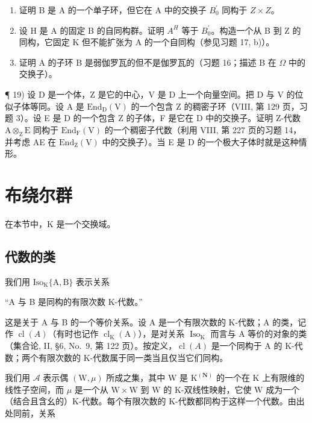 \begin{enumerate}
\def\labelenumi{\alph{enumi})}
\setcounter{enumi}{1}
\item
  证明 B 是 A 的一个单子环，但它在 A 中的交换子 \(B_{0}^{\prime}\) 同构于 \(Z \times Z\)。
\item
  设 H 是 A 的固定 B 的自同构群。证明 \(A^{H}\) 等于 \(B_{0}^{\prime}\)。构造一个从 B 到 Z 的同构，它固定 K 但不能扩张为 A 的一个自同构（参见习题 17, b)）。
\item
  证明 A 的子环 B 是弱伽罗瓦的但不是伽罗瓦的（习题 16；描述 B 在 \(\Omega\) 中的交换子）。
\end{enumerate}

¶ 19) 设 D 是一个体，Z 是它的中心，V 是 D 上一个向量空间。把 D 与 V 的位似子体等同。设 A 是 \(\mathrm{End}_{\mathrm{D}}(\mathrm{V})\) 的一个包含 Z 的稠密子环（VIII, 第 129 页，习题 3）。设 E 是 D 的一个包含 Z 的子体，F 是它在 D 中的交换子。证明 Z-代数 \(\mathrm{A} \otimes_{\mathrm{Z}} \mathrm{E}\) 同构于 \(\mathrm{End}_{\mathrm{F}}(\mathrm{V})\) 的一个稠密子代数（利用 VIII, 第 227 页的习题 14，并考虑 AE 在 \(\mathrm{End}_{\mathrm{Z}}(\mathrm{V})\) 中的交换子）。当 E 是 D 的一个极大子体时就是这种情形。

\section{布绕尔群}

在本节中，K 是一个交换域。

\subsection{代数的类}

我们用 \(\mathrm{Iso}_{\mathrm{K}}\{\mathrm{A},\mathrm{B}\}\) 表示关系

“A 与 B 是同构的有限次数 K-代数。”

这是关于 A 与 B 的一个等价关系。设 A 是一个有限次数的 K-代数；A 的类，记作 \(\operatorname{cl}(A)\)（有时也记作 \(\operatorname{cl}_{\mathrm{K}}(\mathrm{A})\)），是对关系 \(\operatorname{Iso}_{\mathrm{K}}\) 而言与 A 等价的对象的类（集合论, II, §6, No.~9, 第 122 页）。按定义，\(\operatorname{cl}(A)\) 是一个同构于 A 的 K-代数；两个有限次数的 K-代数属于同一类当且仅当它们同构。

我们用 \(\mathcal{A}\) 表示偶 \((\mathrm{W},\mu)\) 所成之集，其中 \(\mathrm{W}\) 是 \(\mathrm{K}^{(\mathbf{N})}\) 的一个在 \(\mathrm{K}\) 上有限维的线性子空间，而 \(\mu\) 是一个从 \(\mathrm{W} \times \mathrm{W}\) 到 \(\mathrm{W}\) 的 K-双线性映射，它使 \(\mathrm{W}\) 成为一个（结合且含幺的）K-代数。每个有限次数的 K-代数都同构于这样一个代数。由出处同前，关系


